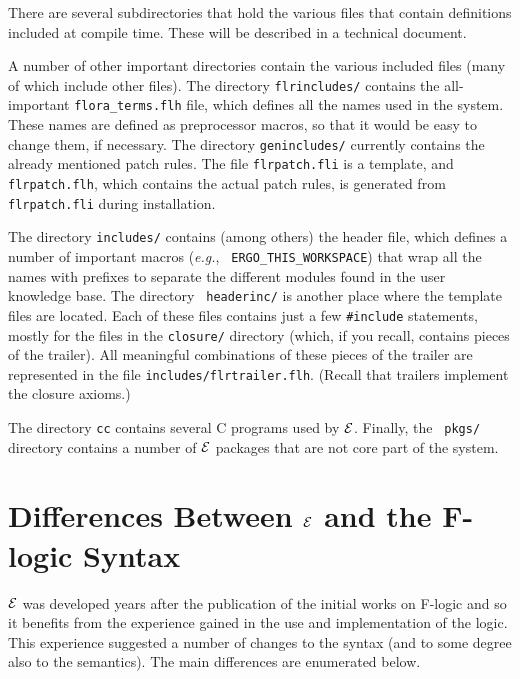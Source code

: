 \documentclass[11pt]{article}
\newcommand{\ERGO}{\mbox{\ensuremath{\cal{E}}\smaller{{\sc{RGO}}}}\xspace}
\newcommand{\FLSYSTEM}{\ERGO}
\begin{document}
There are several subdirectories that hold the various files that contain
definitions included at compile time. These will be described in a
technical document.

A number of other important directories contain the various included files
(many of which include other files). The directory {\tt flrincludes/}
contains the all-important {\tt flora\_terms.flh} file, which defines all
the names used in the system. These names are defined as preprocessor
macros, so that it would be easy to change them, if necessary.
The directory {\tt genincludes/} currently contains the already mentioned
patch rules. The file {\tt flrpatch.fli} is a template, and {\tt
  flrpatch.flh}, which contains the actual patch rules, is generated from
{\tt flrpatch.fli} during installation.

The directory {\tt includes/} contains (among others) the header file,
which defines a number of important macros ({\it e.g.}, {\tt
  ERGO\_THIS\_WORKSPACE}) that wrap all the names with prefixes to
separate the different modules found in the user knowledge base.  The directory {\tt
  headerinc/} is another place where the template files are located. Each
of these files contains just a few {\tt \#include} statements, mostly for
the files in the {\tt closure/} directory (which, if you recall, contains
pieces of the trailer). All meaningful combinations of these pieces of the
trailer are represented in the file {\tt includes/flrtrailer.flh}.  (Recall
that trailers implement the closure axioms.)

The directory {\tt cc} contains several C programs used by \FLSYSTEM.
Finally, the {\tt
  pkgs/} directory contains a number of \FLSYSTEM packages that are not
core part of the system.

\newpage
\section{Differences Between \FLSYSTEM and the F-logic Syntax}

\FLSYSTEM was developed years after the publication of the initial
works on F-logic \cite{KLW95} and so it benefits from the experience gained
in the use and implementation of the logic. This experience suggested a
number of changes to the syntax (and to some degree also to the
semantics). The main differences are enumerated below.
\end{document}
